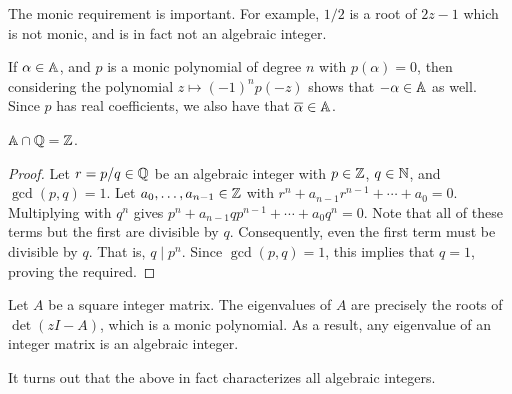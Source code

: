 		The monic requirement is important. For example, $1/2$ is a root of $2z-1$ which is not monic, and is in fact not an algebraic integer.

		\begin{fex}
			If $\alpha \in \mathbb{A}$, and $p$ is a monic polynomial of degree $n$ with $p(\alpha) = 0$, then considering the polynomial $z \mapsto (-1)^n p(-z)$ shows that $-\alpha \in \mathbb{A}$ as well. Since $p$ has real coefficients, we also have that $\overline{\alpha} \in \mathbb{A}$.
		\end{fex}

		\begin{fprop}
			\label{prop: rational alg ints are ints}
			$\mathbb{A} \cap \mathbb{Q} = \mathbb{Z}$.
		\end{fprop}
		\begin{proof}
			Let $r = p/q \in \mathbb{Q}$ be an algebraic integer with $p \in \mathbb{Z}$, $q \in \mathbb{N}$, and $\gcd(p,q) = 1$. Let $a_0,\ldots,a_{n-1} \in \mathbb{Z}$ with $r^n + a_{n-1}r^{n-1} + \cdots + a_0 = 0$. Multiplying with $q^n$ gives $p^n + a_{n-1}qp^{n-1} + \cdots + a_0q^n = 0$. Note that all of these terms but the first are divisible by $q$. Consequently, even the first term must be divisible by $q$. That is, $q \mid p^n$. Since $\gcd(p,q) = 1$, this implies that $q=1$, proving the required.
		\end{proof}

		\begin{fex}
			Let $A$ be a square integer matrix. The eigenvalues of $A$ are precisely the roots of $\det(zI - A)$, which is a monic polynomial. As a result, any eigenvalue of an integer matrix is an algebraic integer.
		\end{fex}

		It turns out that the above in fact characterizes all algebraic integers.

